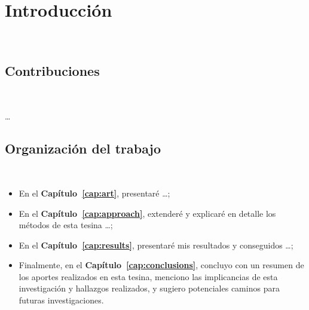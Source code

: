 \chapter{Introducción}
~\label{cap:intro}

\section{Contribuciones}
~\label{cap:intro:sec:contributions}

\ldots

\section{Organización del trabajo}
~\label{cap:intro:sec:outline}

\begin{itemize}
	\item En el \textbf{Capítulo~\ref{cap:art}}, presentaré \ldots ;

	\item En el \textbf{Capítulo~\ref{cap:approach}}, extenderé y explicaré en detalle
	      los métodos de esta tesina \ldots ;

	\item En el \textbf{Capítulo~\ref{cap:results}}, presentaré mis resultados y
	      conseguidos \ldots;

	\item Finalmente, en el \textbf{Capítulo~\ref{cap:conclusions}}, concluyo con un
	      resumen de los aportes realizados en esta tesina, menciono las implicancias de
	      esta investigación y hallazgos realizados, y sugiero potenciales caminos para
	      futuras investigaciones. %

\end{itemize}

